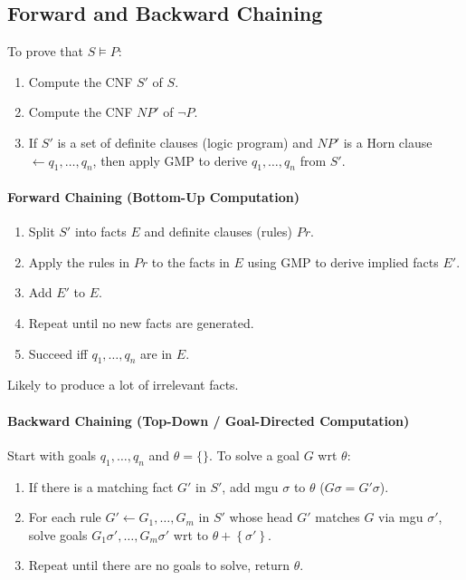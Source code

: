 \documentclass[twocolumn,english]{article}
\begin{document}
\subsection{Forward and Backward Chaining}

To prove that $S\vDash P$:
\begin{enumerate}
\item Compute the CNF $S'$ of $S$.
\item Compute the CNF $NP'$ of $\lnot P$.
\item If $S'$ is a set of definite clauses (logic program) and $NP'$ is
a Horn clause $\leftarrow q_{1},\dots,q_{n}$, then apply GMP to derive
$q_{1},\dots,q_{n}$ from $S'$.
\end{enumerate}

\paragraph{Forward Chaining (Bottom-Up Computation)}
\begin{enumerate}
\item Split $S'$ into facts $E$ and definite clauses (rules) $Pr$.
\item Apply the rules in $Pr$ to the facts in $E$ using GMP to derive
implied facts $E'$.
\item Add $E'$ to $E$.
\item Repeat until no new facts are generated.
\item Succeed iff $q_{1},\dots,q_{n}$ are in $E$.
\end{enumerate}
Likely to produce a lot of irrelevant facts.

\paragraph{Backward Chaining (Top-Down / Goal-Directed Computation)}

Start with goals $q_{1},\dots,q_{n}$ and $\theta=\{\}$. To solve
a goal $G$ wrt $\theta$:
\begin{enumerate}
\item If there is a matching fact $G'$ in $S'$, add mgu $\sigma$ to $\theta$
($G\sigma=G'\sigma$).
\item For each rule $G'\leftarrow G_{1},\dots,G_{m}$ in $S'$ whose head
$G'$ matches $G$ via mgu $\sigma'$, solve goals $G_{1}\sigma',\dots,G_{m}\sigma'$
wrt to $\theta+\left\{ \sigma'\right\} $.
\item Repeat until there are no goals to solve, return $\theta$.
\end{enumerate}
\end{document}
